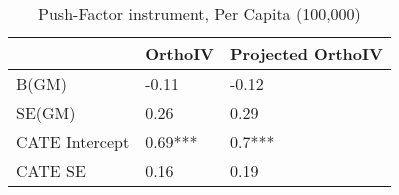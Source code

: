 \begin{table}\centering\caption{Push-Factor instrument, Per Capita (100,000)}\begin{tabular}{lll}
\toprule
                & OrthoIV   & Projected OrthoIV   \\
\midrule
 B(GM)          & -0.11     & -0.12               \\
 SE(GM)         & 0.26      & 0.29                \\
 CATE Intercept & 0.69***   & 0.7***              \\
 CATE SE        & 0.16      & 0.19                \\
\bottomrule
\end{tabular}\end{table}